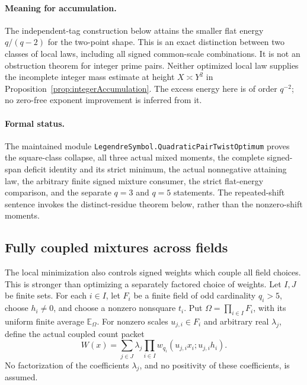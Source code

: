 \documentclass[11pt]{article}
\begin{document}
\paragraph{Meaning for accumulation.}
The independent-tag construction below attains the smaller flat
energy \(q/(q-2)\) for the two-point shape.
This is an exact distinction between two classes of local laws,
including all signed common-scale combinations.
It is not an obstruction theorem for integer prime pairs.
Neither optimized local law supplies the incomplete integer mass
estimate at height \(X\asymp Y^2\) in
Proposition~\ref{prop:integerAccumulation}.
The excess energy here is of order \(q^{-2}\);
no zero-free exponent improvement is inferred from it.

\paragraph{Formal status.}
The maintained module
\texttt{LegendreSymbol.QuadraticPairTwistOptimum}
proves the square-class collapse, all three actual mixed moments,
the complete signed-span deficit identity and its strict minimum,
the actual nonnegative attaining law, the arbitrary finite signed
mixture consumer, the strict flat-energy comparison, and the
separate \(q=3\) and \(q=5\) statements.
The repeated-shift sentence invokes the distinct-residue theorem
below, rather than the nonzero-shift moments.

\subsection{Fully coupled mixtures across fields}

The local minimization also controls signed weights which couple all
field choices. This is stronger than optimizing a separately factored
choice of weights.
Let \(I,J\) be finite sets. For each \(i\in I\), let \(F_i\) be a
finite field of odd cardinality \(q_i>5\), choose \(h_i\ne0\), and
choose a nonzero nonsquare \(t_i\).
Put \(\Omega=\prod_{i\in I}F_i\), with its uniform finite average
\(\mathbb E_\Omega\).
For nonzero scales \(u_{j,i}\in F_i\) and arbitrary real
\(\lambda_j\), define the actual coupled count packet
\[
 W(x)=\sum_{j\in J}\lambda_j
         \prod_{i\in I}w_{q_i}(u_{j,i}x_i;u_{j,i}h_i).
\]
No factorization of the coefficients \(\lambda_j\), and no positivity
of these coefficients, is assumed.
\end{document}
